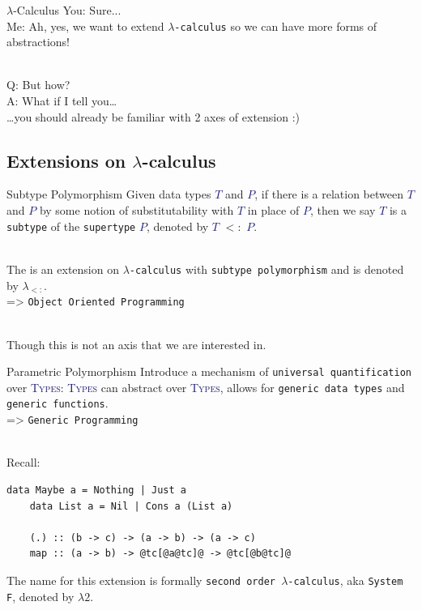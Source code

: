 \documentclass[xcolor={usenames,dvipsnames}]{beamer}
\newcommand{\htycon}[1]{\textcolor{MidnightBlue}{\textsc{#1}}}
\begin{document}
\begin{frame}[fragile]{$\lambda$-Calculus}
  You: Sure...\\
  Me: Ah, yes, we want to extend \texttt{$\lambda$-calculus} so we can have more forms of abstractions!

  \ \\
  \pause
  Q: But how?\\
  A: What if I tell you\ldots\\
  \qquad \ldots you should already be familiar with 2 axes of extension :)
\end{frame}


\subsection{Extensions on $\lambda$-calculus}

\begin{frame}[fragile]{Subtype Polymorphism}
  Given data types \htycon{$T$} and \htycon{$P$}, if there is a relation between \htycon{$T$} and \htycon{$P$} by some notion of substitutability with \htycon{$T$} in place of \htycon{$P$}, then we say \htycon{$T$} is a \texttt{subtype} of the \texttt{supertype} \htycon{$P$}, denoted by \htycon{$T$} $<:$ \htycon{$P$}.

  \ \\
  The is an extension on \texttt{$\lambda$-calculus} with \texttt{subtype polymorphism} and is denoted by $\lambda_{<:}$.\\
  => \texttt{Object Oriented Programming}
  
  \ \\
  \scriptsize{Though this is not an axis that we are interested in}.
\end{frame}

\begin{frame}[fragile]{Parametric Polymorphism}
  Introduce a mechanism of \texttt{universal quantification} over \htycon{Types}: \htycon{Types} can abstract over \htycon{Types}, allows for \texttt{generic data types} and \texttt{generic functions}.\\
  => \texttt{Generic Programming}

  \ \\
  Recall:
  \begin{lstlisting}[style=hask]
    data Maybe a = Nothing | Just a
    data List a = Nil | Cons a (List a)

    (.) :: (b -> c) -> (a -> b) -> (a -> c)
    map :: (a -> b) -> @tc[@a@tc]@ -> @tc[@b@tc]@
  \end{lstlisting}

  The name for this extension is formally \texttt{second order $\lambda$-calculus}, aka \texttt{System F}, denoted by $\lambda2$.
\end{frame}
\end{document}
